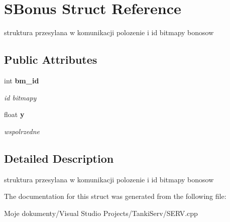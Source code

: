 \section{SBonus Struct Reference}
\label{struct_s_bonus}
struktura przesylana w komunikacji polozenie i id bitmapy bonosow  


\subsection*{Public Attributes}
\begin{CompactItemize}
\item 
int {\bf bm\_\-id}\label{struct_s_bonus_3b0eb3383ccb68906183719a16d66809}

\begin{CompactList}\small\item\em id bitmapy \item\end{CompactList}\item 
float {\bf y}\label{struct_s_bonus_68ebf510079e1dfe49640143c3564b83}

\begin{CompactList}\small\item\em wspolrzedne \item\end{CompactList}\end{CompactItemize}


\subsection{Detailed Description}
struktura przesylana w komunikacji polozenie i id bitmapy bonosow 



The documentation for this struct was generated from the following file:\begin{CompactItemize}
\item 
Moje dokumenty/Visual Studio Projects/TankiServ/SERV.cpp\end{CompactItemize}
